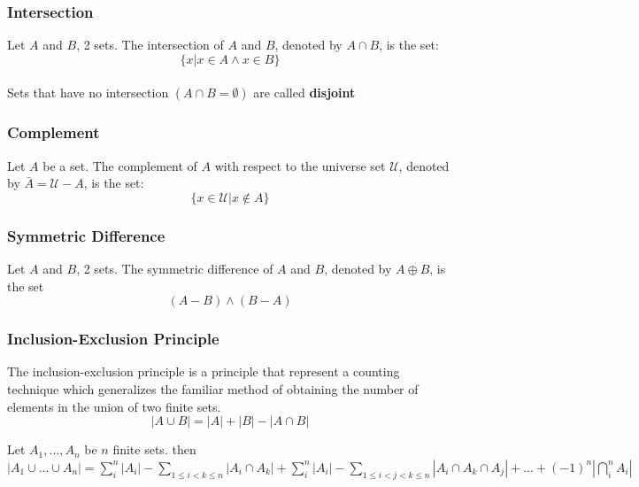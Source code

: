 \documentclass{article}
\begin{document}
\subsubsection{Intersection} Let $ A $ and $ B $, 2 sets. The intersection of $ A $ and $ B $, denoted by $ A \cap B $, is the set:
\begin{equation}
\{x | x \in A \wedge x \in B\}
\end{equation}
\\
Sets that have no intersection $ (A \cap B = \emptyset) $ are called \textbf{disjoint}

\subsubsection{Complement} Let $ A $ be a set. The complement of $ A $ with respect to the universe set $ \mathcal{U} $, denoted by $ \bar{A} = \mathcal{U} - A $, is the set:
\begin{equation}
\{x \in \mathcal{U} | x \notin A\}
\end{equation}

\subsubsection{Symmetric Difference} Let $ A $ and $ B $, 2 sets. The symmetric difference of $ A $ and $ B $, denoted by $ A \oplus B $, is the set
\begin{equation}
(A - B) \wedge (B - A)
\end{equation}

\subsubsection{Inclusion-Exclusion Principle} The inclusion-exclusion principle is a principle that represent a counting technique which generalizes the familiar method of obtaining the number of elements in the union of two finite sets. 
\begin{equation}
|A \cup B| = |A| + |B| - |A \cap B|
\end{equation}
\begin{tcolorbox}[sharp corners, colback=green!30, colframe=green!80!blue, title=Cardinality of Sets Union]
Let $ A_1,...,A_n $ be $ n $ finite sets. then $ |A_1 \cup ... \cup A_n| = \sum_{i}^{n}|A_i| - \sum_{1 \leq i < k \leq n}|A_i \cap A_k| + \sum_{i}^{n}|A_i| - \sum_{1 \leq i < j < k \leq n}|A_i \cap A_k \cap A_j| + ... + (-1)^n |\bigcap\limits_{i}^{n}A_i| $ 
\end{tcolorbox}
\end{document}
